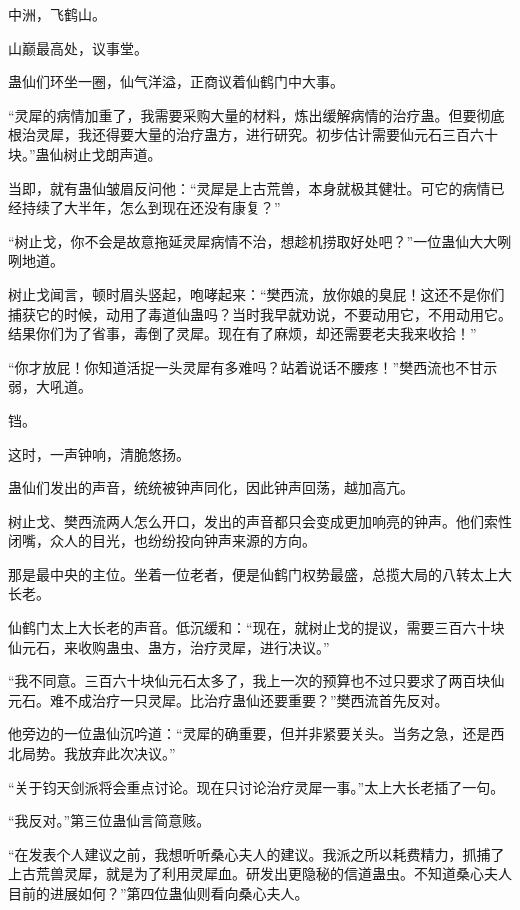 
\begin{this_body}



中洲，飞鹤山。

山巅最高处，议事堂。

蛊仙们环坐一圈，仙气洋溢，正商议着仙鹤门中大事。

“灵犀的病情加重了，我需要采购大量的材料，炼出缓解病情的治疗蛊。但要彻底根治灵犀，我还得要大量的治疗蛊方，进行研究。初步估计需要仙元石三百六十块。”蛊仙树止戈朗声道。

当即，就有蛊仙皱眉反问他：“灵犀是上古荒兽，本身就极其健壮。可它的病情已经持续了大半年，怎么到现在还没有康复？”

“树止戈，你不会是故意拖延灵犀病情不治，想趁机捞取好处吧？”一位蛊仙大大咧咧地道。

树止戈闻言，顿时眉头竖起，咆哮起来：“樊西流，放你娘的臭屁！这还不是你们捕获它的时候，动用了毒道仙蛊吗？当时我早就劝说，不要动用它，不用动用它。结果你们为了省事，毒倒了灵犀。现在有了麻烦，却还需要老夫我来收拾！”

“你才放屁！你知道活捉一头灵犀有多难吗？站着说话不腰疼！”樊西流也不甘示弱，大吼道。

铛。

这时，一声钟响，清脆悠扬。

蛊仙们发出的声音，统统被钟声同化，因此钟声回荡，越加高亢。

树止戈、樊西流两人怎么开口，发出的声音都只会变成更加响亮的钟声。他们索性闭嘴，众人的目光，也纷纷投向钟声来源的方向。

那是最中央的主位。坐着一位老者，便是仙鹤门权势最盛，总揽大局的八转太上大长老。

仙鹤门太上大长老的声音。低沉缓和：“现在，就树止戈的提议，需要三百六十块仙元石，来收购蛊虫、蛊方，治疗灵犀，进行决议。”

“我不同意。三百六十块仙元石太多了，我上一次的预算也不过只要求了两百块仙元石。难不成治疗一只灵犀。比治疗蛊仙还要重要？”樊西流首先反对。

他旁边的一位蛊仙沉吟道：“灵犀的确重要，但并非紧要关头。当务之急，还是西北局势。我放弃此次决议。”

“关于钧天剑派将会重点讨论。现在只讨论治疗灵犀一事。”太上大长老插了一句。

“我反对。”第三位蛊仙言简意赅。

“在发表个人建议之前，我想听听桑心夫人的建议。我派之所以耗费精力，抓捕了上古荒兽灵犀，就是为了利用灵犀血。研发出更隐秘的信道蛊虫。不知道桑心夫人目前的进展如何？”第四位蛊仙则看向桑心夫人。


\end{this_body}
